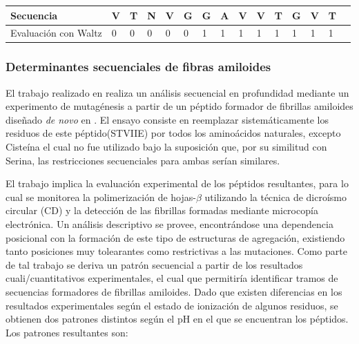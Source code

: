 \vspace{0.5cm}
\noindent
\begin{center}
\begin{tabular}{lllllllllllllll} 
\hline    
Secuencia & \textbf{V} & \textbf{T} & \textbf{N} & \textbf{V} & \textbf{G} & \textbf{G} & \textbf{A} & \textbf{V} & \textbf{V} &\textbf{T} & \textbf{G} & \textbf{V} & \textbf{T}  \\ \hline
Evaluación con Waltz & 0 & 0 & 0 & 0 & 0 & 1 & 1 & 1 & 1 & 1 & 1 & 1 & 1 \\ \hline
\end{tabular}
\end{center}







\subsubsection{Determinantes secuenciales de fibras amiloides}\label{determinantesSecuenciales}

El trabajo realizado en \cite{de2004sequence} realiza un análisis secuencial en  profundidad mediante un experimento de mutagénesis a partir de un péptido formador de fibrillas amiloides diseñado \textit{de novo} en \cite{de2002novo}. 
El ensayo consiste en reemplazar sistemáticamente los residuos de este péptido(STVIIE) por todos los aminoácidos naturales, excepto Cisteína el cual no fue utilizado bajo la suposición que, por su similitud con Serina, las restricciones 
secuenciales para ambas serían similares.


El trabajo implica la evaluación experimental de los péptidos resultantes, para lo cual se monitorea la polimerización de hojas-$\beta$ utilizando la técnica de dicroísmo circular (CD) y la detección de las fibrillas formadas mediante 
microcopía electrónica. Un análisis descriptivo se provee\cite{de2004sequence}, encontrándose una dependencia posicional con la formación de este tipo de estructuras de agregación, existiendo tanto posiciones muy tolearantes como 
restrictivas a las mutaciones.
Como parte de tal trabajo se deriva un patrón secuencial a partir de los resultados cuali/cuantitativos experimentales, el cual que permitiría identificar tramos de secuencias formadores de fibrillas amiloides.
Dado que existen diferencias en los resultados experimentales según el estado de ionización de algunos residuos, se obtienen dos patrones distintos según el pH en el que se encuentran los péptidos.
Los patrones resultantes son:
\vspace{0.2cm}

